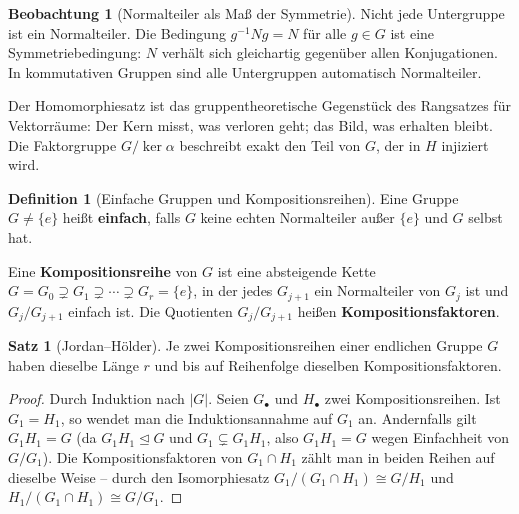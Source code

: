 ﻿\documentclass[a4paper,12pt]{report}
\theoremstyle{definition}
\newtheorem{definition}{Definition}
\newtheorem{satz}{Satz}
\newtheorem{beobachtung}{Beobachtung}
\begin{document}
\begin{beobachtung}[Normalteiler als Maß der Symmetrie]
    Nicht jede Untergruppe ist ein Normalteiler. Die Bedingung
    $g^{-1}Ng = N$ für alle $g \in G$ ist eine Symmetriebedingung:
    $N$ verhält sich gleichartig gegenüber allen Konjugationen.
    In kommutativen Gruppen sind alle Untergruppen automatisch Normalteiler.

    Der Homomorphiesatz ist das gruppentheoretische Gegenstück des
    Rangsatzes für Vektorräume: Der Kern misst, was verloren geht;
    das Bild, was erhalten bleibt. Die Faktorgruppe $G/\ker\alpha$
    beschreibt exakt den Teil von $G$, der in $H$ injiziert wird.
\end{beobachtung}

\begin{definition}[Einfache Gruppen und Kompositionsreihen]
    Eine Gruppe $G \neq \{e\}$ heißt \textbf{einfach}, falls $G$ keine
    echten Normalteiler außer $\{e\}$ und $G$ selbst hat.

    Eine \textbf{Kompositionsreihe} von $G$ ist eine absteigende Kette
    $G = G_0 \supsetneq G_1 \supsetneq \cdots \supsetneq G_r = \{e\}$,
    in der jedes $G_{j+1}$ ein Normalteiler von $G_j$ ist und
    $G_j/G_{j+1}$ einfach ist. Die Quotienten $G_j/G_{j+1}$ heißen
    \textbf{Kompositionsfaktoren}.
\end{definition}

\begin{satz}[Jordan--Hölder]
    Je zwei Kompositionsreihen einer endlichen Gruppe $G$ haben dieselbe
    Länge $r$ und bis auf Reihenfolge dieselben Kompositionsfaktoren.
\end{satz}
\begin{proof}
    Durch Induktion nach $|G|$. Seien $G_\bullet$ und $H_\bullet$ zwei
    Kompositionsreihen. Ist $G_1 = H_1$, so wendet man die Induktionsannahme
    auf $G_1$ an. Andernfalls gilt $G_1 H_1 = G$ (da $G_1 H_1 \trianglelefteq G$
    und $G_1 \subsetneq G_1 H_1$, also $G_1 H_1 = G$ wegen Einfachheit von $G/G_1$).
    Die Kompositionsfaktoren von $G_1 \cap H_1$ zählt man in beiden
    Reihen auf dieselbe Weise -- durch den Isomorphiesatz
    $G_1/(G_1 \cap H_1) \cong G/H_1$ und $H_1/(G_1 \cap H_1) \cong G/G_1$.
\end{proof}
\end{document}
